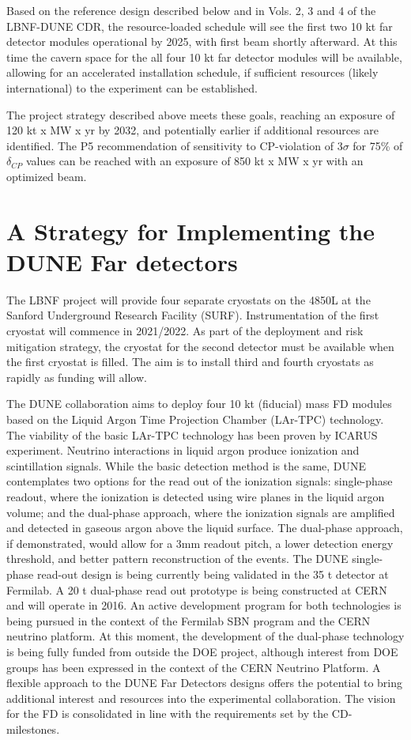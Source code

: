 Based on the reference design described below and in Vols. 2, 3 and 4 of the LBNF-DUNE 
CDR, the resource-loaded schedule will see the first two 10 kt far detector modules 
operational by 2025, with first beam shortly afterward. At this time the cavern 
space for the all four 10 kt far detector modules will be available, allowing for 
an accelerated installation schedule, if sufficient resources (likely international) 
to the experiment can be established.  

\vspace{6pt}
The project strategy described above meets these goals, reaching an exposure of 
120 kt x MW x yr by 2032, and potentially earlier if additional resources are identified. 
The P5 recommendation of sensitivity to CP-violation of 3$\sigma$ for 75\% of $\delta_{CP}$
values can be reached with an exposure of 850 kt x MW x yr with an optimized beam.

\section{A Strategy for Implementing the DUNE Far detectors}

The LBNF project will provide four separate cryostats on the 4850L at the 
Sanford Underground Research Facility (SURF).  Instrumentation of the first cryostat 
will commence in 2021/2022. As part of the deployment and risk mitigation strategy, 
the cryostat for the second detector must be available when the first cryostat 
is filled. The aim is to install third and fourth cryostats as rapidly as funding 
will allow.

The DUNE collaboration aims to deploy four 10 kt (fiducial) mass FD modules based 
on the Liquid Argon Time Projection Chamber (LAr-TPC) technology. The viability 
of the basic LAr-TPC technology has been proven by ICARUS experiment. Neutrino 
interactions in liquid argon produce ionization and scintillation signals. While 
the basic detection method is the same, DUNE contemplates two options for the read 
out of the ionization signals: single-phase readout, where the ionization is detected 
using wire planes in the liquid argon volume; and the dual-phase approach, where 
the ionization signals are amplified and detected in gaseous argon above the liquid 
surface. The dual-phase approach, if demonstrated, would allow for a 3mm readout 
pitch, a lower detection energy threshold, and better pattern reconstruction of 
the events. The DUNE single-phase read-out design is being currently being validated 
in the 35 t detector at Fermilab. A 20 t dual-phase read out prototype is being 
constructed at CERN and will operate in 2016. An active development program for 
both technologies is being pursued in the context of the Fermilab SBN program and 
the CERN neutrino platform. At this moment, the development of the dual-phase technology 
is being fully funded from outside the DOE project, although interest from DOE 
groups has been expressed in the context of the CERN Neutrino Platform. A flexible 
approach to the DUNE Far Detectors designs offers the potential to bring additional 
interest and resources into the experimental collaboration. The vision for the 
FD is consolidated in line with the requirements set by the CD-milestones.

